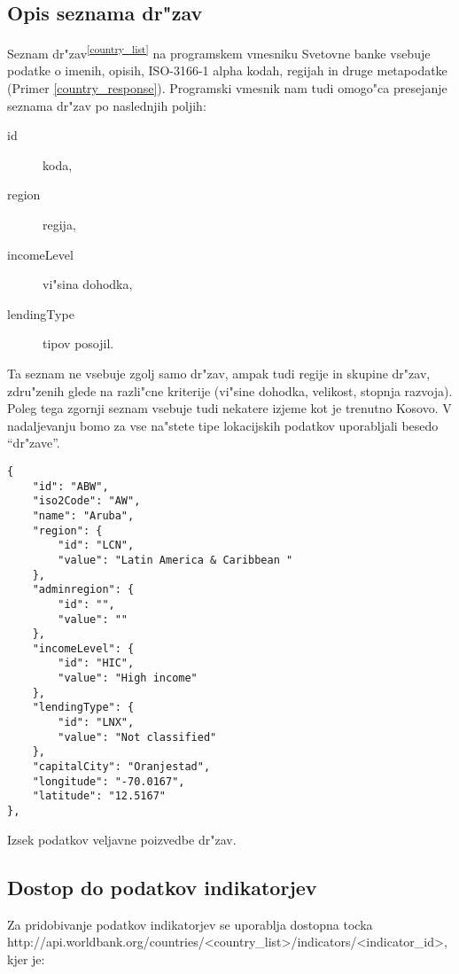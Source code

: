 \subsection{Opis seznama dr"zav}

Seznam dr"zav\textsuperscript{\ref{country_list}}  na programskem vmesniku 
Svetovne banke vsebuje podatke o imenih, opisih, ISO-3166-1 alpha kodah, 
regijah in druge metapodatke (Primer \ref{country_response}). Programski
vmesnik nam tudi omogo"ca presejanje seznama dr"zav po naslednjih poljih:
\begin{description}
\item [id] koda,
\item [region] regija,
\item [incomeLevel] vi"sina dohodka,
\item [lendingType] tipov posojil. %
\end{description}

Ta seznam ne vsebuje zgolj samo dr"zav, ampak tudi regije in skupine dr"zav, 
zdru"zenih glede na razli"cne kriterije (vi"sine dohodka, velikost, stopnja
razvoja). Poleg tega zgornji seznam vsebuje tudi nekatere izjeme kot je trenutno
Kosovo. V nadaljevanju bomo za vse na"stete tipe lokacijskih podatkov
uporabljali besedo ``dr"zave''.

\begin{snippet}
\begin{center}
\begin{lstlisting}
{
    "id": "ABW",
    "iso2Code": "AW",
    "name": "Aruba",
    "region": {
        "id": "LCN",
        "value": "Latin America & Caribbean "
    },
    "adminregion": {
        "id": "",
        "value": ""
    },
    "incomeLevel": {
        "id": "HIC",
        "value": "High income"
    },
    "lendingType": {
        "id": "LNX",
        "value": "Not classified"
    },
    "capitalCity": "Oranjestad",
    "longitude": "-70.0167",
    "latitude": "12.5167"
},
\end{lstlisting}
\end{center}
\caption[some]{Izsek podatkov veljavne poizvedbe dr"zav.}
\label{country_response}
\end{snippet} 


\subsection{Dostop do podatkov indikatorjev}


Za pridobivanje podatkov indikatorjev se uporablja dostopna tocka \\
http://api.worldbank.org/countries/<country\_list>/indicators/<indicator\_id>, \\
kjer je:



